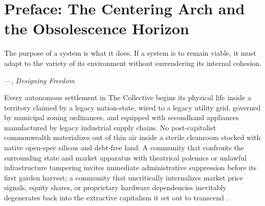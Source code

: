 \chapter*{Preface: The Centering Arch and the Obsolescence Horizon}

\epigraph{The purpose of a system is what it does. If a system is to remain viable, it must adapt to the variety of its environment without surrendering its internal cohesion.}{---\textcite{beer1974}, \textit{Designing Freedom}}

Every autonomous settlement in The Collective begins its physical life inside a territory claimed by a legacy nation-state, wired to a legacy utility grid, governed by municipal zoning ordinances, and equipped with secondhand appliances manufactured by legacy industrial supply chains. No post-capitalist commonwealth materializes out of thin air inside a sterile cleanroom stocked with native open-spec silicon and debt-free land. A community that confronts the surrounding state and market apparatus with theatrical polemics or unlawful infrastructure tampering invites immediate administrative suppression before its first garden harvest; a community that uncritically internalizes market price signals, equity shares, or proprietary hardware dependencies inevitably degenerates back into the extractive capitalism it set out to transcend \parencite{polanyi1944great,cornforth1995}.

